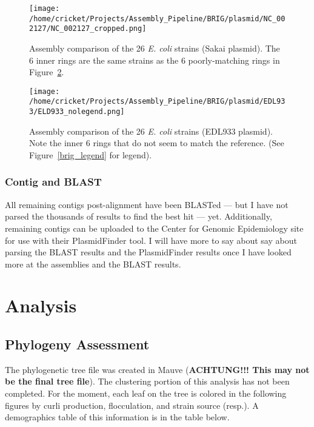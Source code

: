 \documentclass[11pt]{article}
\begin{document}
\begin{figure}[h!]\normalsize %
\centering
\texttt{[image: /home/cricket/Projects/Assembly\_Pipeline/BRIG/plasmid/NC\_002127/NC\_002127\_cropped.png]}
\caption{Assembly comparison of the 26 \textit{E. coli} strains (Sakai plasmid). The 6 inner rings are the same strains as the 6 poorly-matching rings in Figure~\ref{plasmid_alignment_1}.}
\label{plasmid_alignment_2}
\end{figure}

\begin{figure}[h!]\normalsize %
\centering
\texttt{[image: /home/cricket/Projects/Assembly\_Pipeline/BRIG/plasmid/EDL933/ELD933\_nolegend.png]}
\caption{Assembly comparison of the 26 \textit{E. coli} strains (EDL933 plasmid). Note the inner 6 rings that do not seem to match the reference. (See Figure~\ref{brig_legend} for legend).}
\label{plasmid_alignment_1}
\end{figure}
\clearpage


\subsubsection*{Contig and BLAST}
All remaining contigs post-alignment have been BLASTed --- but I have not parsed the thousands of results to find the best hit --- yet. Additionally, remaining contigs can be uploaded to the Center for Genomic Epidemiology site for use with their PlasmidFinder tool. I will have more to say about say about parsing the BLAST results and the PlasmidFinder results once I have looked more at the assemblies and the BLAST results. \\

\section*{Analysis}
\subsection*{Phylogeny Assessment}
The phylogenetic tree file was created in Mauve (\textbf{ACHTUNG!!! This may not be the final tree file}). The clustering portion of this analysis has not been completed. For the moment, each leaf on the tree is colored in the following figures by curli production, flocculation, and strain source (resp.). A demographics table of this information is in the table below. \\
\end{document}
